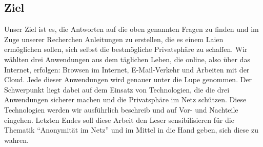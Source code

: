 \subsection{Ziel}
Unser Ziel ist es, die Antworten auf die oben genannten Fragen zu finden und im Zuge unserer Recherchen Anleitungen zu erstellen, die es einem Laien ermöglichen sollen, sich selbst die bestmögliche Privatsphäre zu schaffen. Wir wählten drei Anwendungen aus dem täglichen Leben, die online, also über das Internet, erfolgen: Browsen im Internet, E-Mail-Verkehr und Arbeiten mit der Cloud. Jede dieser Anwendungen wird genauer unter die Lupe genommen. Der Schwerpunkt liegt dabei auf dem Einsatz von Technologien, die die drei Anwendungen sicherer machen und die Privatsphäre im Netz schützen. Diese Technologien werden wir ausführlich beschreib und auf Vor- und Nachteile eingehen. Letzten Endes soll diese Arbeit den Leser sensibilisieren für die Thematik ``Anonymität im Netz'' und im Mittel in die Hand geben, sich diese zu wahren.
